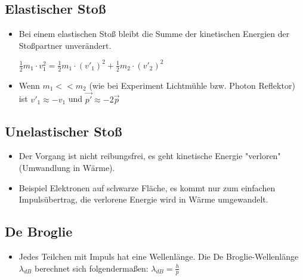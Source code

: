 \subsection{Elastischer Stoß}
\begin{itemize}
\item Bei einem elastischen Stoß bleibt die Summe der kinetischen Energien der Stoßpartner unverändert.

$\frac{1}{2}m_1 \cdot v_1^2 = \frac{1}{2}m_1 \cdot (v'_1)^2 + \frac{1}{2}m_2 \cdot (v'_2)^2$
\item Wenn $m_1 << m_2$ (wie bei Experiment Lichtmühle bzw. Photon Reflektor) ist $v'_1 \approx -v_1$ und $\vec{p'} \approx -2 \vec{p}$
\end{itemize}

\subsection{Unelastischer Stoß}
\begin{itemize}
\item Der Vorgang ist nicht reibungsfrei, es geht kinetische Energie "verloren" (Umwandlung in Wärme).
\item Beispiel Elektronen auf schwarze Fläche, es kommt nur zum einfachen Impulsübertrag, die verlorene Energie wird in Wärme umgewandelt.
\end{itemize}


\subsection{De Broglie} \label{subsec:DeBroglie}
\begin{itemize}
\item Jedes Teilchen mit Impuls hat eine Wellenlänge. Die De Broglie-Wellenlänge $\lambda_{dB}$ berechnet sich folgendermaßen: $\lambda_{dB} = \frac{h}{p}$
\end{itemize}

